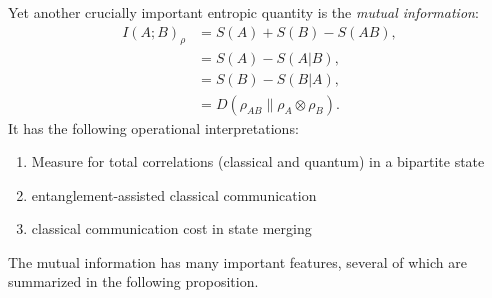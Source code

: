 \documentclass[notoc]{tufte-book}
\begin{document}
Yet another crucially important entropic quantity is the \textit{mutual information}:
\begin{align}
    I(A;B)_{\rho} &= S(A) +S(B) -S(AB),\\
    &=S(A)-S(A|B),\\
    &=S(B)-S(B|A),\\
    &=D(\rho_{AB} \| \rho_A \otimes \rho_B).
\end{align}
It has the following operational interpretations:
\begin{enumerate}
    \item Measure for total correlations (classical and quantum) in a bipartite state 
    \item entanglement-assisted classical communication
    \item classical communication cost in state merging
\end{enumerate}
The mutual information has many important features, several of which are summarized in the following proposition.
\end{document}
